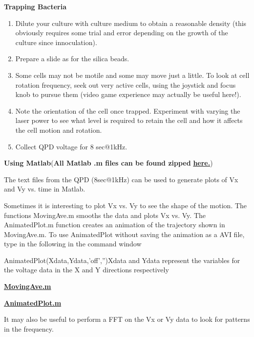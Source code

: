 \documentclass{../lab}
\begin{document}
\textbf{Trapping Bacteria}\begin{enumerate}
    \item Dilute your culture with culture medium to obtain a reasonable density (this obviously requires some trial and error depending on the growth of the culture since innoculation).

    \item Prepare a slide as for the silica beads.

    \item Some cells may not be motile and some may move just a little. To look at cell rotation frequency, seek out very active cells, using the joystick and focus knob to pursue them (video game experience may actually be useful here!).

    \item Note the orientation of the cell once trapped. Experiment with varying the laser power to see what level is required to retain the cell and how it affects the cell motion and rotation.

    \item Collect QPD voltage for 8 sec@1kHz.

\end{enumerate}

\textbf{Using Matlab}(\textbf{All Matlab .m files can be found zipped }\href{http://dev-physicsadv.pantheon.berkeley.edu/sites/default/files/ZIP\_files/OTZ\_Matlab\_files.zip}{\textbf{here.}})

The text files from the QPD (8sec@1kHz) can be used to generate plots of Vx and Vy vs. time in Matlab.

Sometimes it is interesting to plot Vx vs. Vy to see the shape of the motion. The functions MovingAve.m smooths the data and plots Vx vs. Vy. The AnimatedPlot.m function creates an animation of the trajectory shown in MovingAve.m. To use AnimatedPlot without saving the animation as a AVI file, type in the following in the command window

AnimatedPlot(Xdata,Ydata,'off','')Xdata and Ydata represent the variables for the voltage data in the X and Y directions respectively

\href{http://dev-physicsadv.pantheon.berkeley.edu/sites/default/files/matlab\_fitting/MovingAve.m}{\textbf{MovingAve.m}}

\href{http://dev-physicsadv.pantheon.berkeley.edu/sites/default/files/matlab\_fitting/AnimatedPlot.m}{\textbf{AnimatedPlot.m}}

It may also be useful to perform a FFT on the Vx or Vy data to look for patterns in the frequency.
\end{document}
